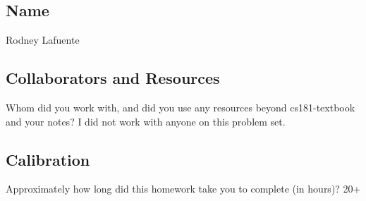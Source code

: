 \documentclass[submit]{harvardml}
\begin{document}
\newpage
\subsection*{Name}
Rodney Lafuente
\subsection*{Collaborators and Resources}
Whom did you work with, and did you use any resources beyond cs181-textbook and your notes?
I did not work with anyone on this problem set.
\subsection*{Calibration}
Approximately how long did this homework take you to complete (in hours)? 
20+
\end{document}

